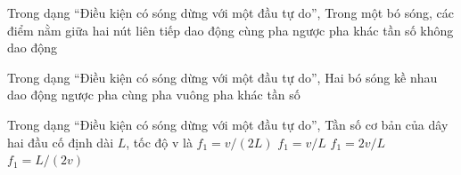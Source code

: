 \begin{ex}
Trong dạng “Điều kiện có sóng dừng với một đầu tự do”, Trong một bó sóng, các điểm nằm giữa hai nút liên tiếp dao động
\choice
{\True cùng pha}
{ngược pha}
{khác tần số}
{không dao động}
\end{ex}

\begin{ex}
Trong dạng “Điều kiện có sóng dừng với một đầu tự do”, Hai bó sóng kề nhau dao động
\choice
{\True ngược pha}
{cùng pha}
{vuông pha}
{khác tần số}
\end{ex}

\begin{ex}
Trong dạng “Điều kiện có sóng dừng với một đầu tự do”, Tần số cơ bản của dây hai đầu cố định dài $L$, tốc độ v là
\choice
{\True $f_1=v/(2L)$}
{$f_1=v/L$}
{$f_1=2v/L$}
{$f_1=L/(2v)$}
\end{ex}
